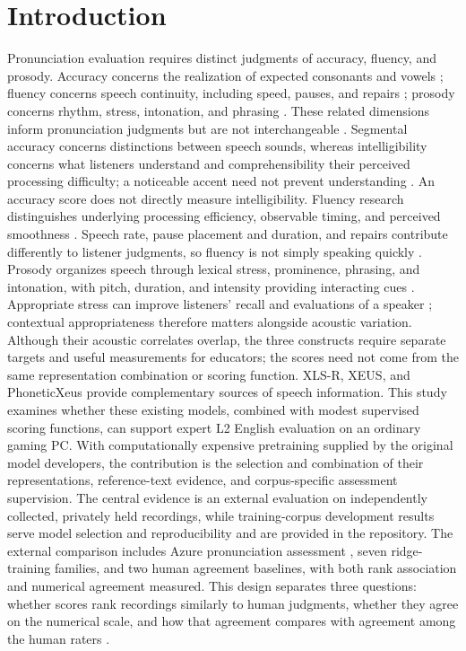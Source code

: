 \documentclass[cameraready]{Interspeech}
\begin{document}
\section{Introduction}
Pronunciation evaluation requires distinct judgments of accuracy, fluency, and prosody. Accuracy concerns the realization of expected consonants and vowels \cite{deterding,cai}; fluency concerns speech continuity, including speed, pauses, and repairs \cite{kormos,bosker}; prosody concerns rhythm, stress, intonation, and phrasing \cite{cole,cutler}. These related dimensions inform pronunciation judgments but are not interchangeable \cite{cai,isaacs}. Segmental accuracy concerns distinctions between speech sounds, whereas intelligibility concerns what listeners understand and comprehensibility their perceived processing difficulty; a noticeable accent need not prevent understanding \cite{munro}. An accuracy score does not directly measure intelligibility. Fluency research distinguishes underlying processing efficiency, observable timing, and perceived smoothness \cite{segalowitz}. Speech rate, pause placement and duration, and repairs contribute differently to listener judgments, so fluency is not simply speaking quickly \cite{kormos,bosker}. Prosody organizes speech through lexical stress, prominence, phrasing, and intonation, with pitch, duration, and intensity providing interacting cues \cite{cole,cutler}. Appropriate stress can improve listeners' recall and evaluations of a speaker \cite{hahn}; contextual appropriateness therefore matters alongside acoustic variation. Although their acoustic correlates overlap, the three constructs require separate targets and useful measurements for educators; the scores need not come from the same representation combination or scoring function. XLS-R, XEUS, and PhoneticXeus provide complementary sources of speech information. This study examines whether these existing models, combined with modest supervised scoring functions, can support expert L2 English evaluation on an ordinary gaming PC. With computationally expensive pretraining supplied by the original model developers, the contribution is the selection and combination of their representations, reference-text evidence, and corpus-specific assessment supervision. The central evidence is an external evaluation on independently collected, privately held recordings, while training-corpus development results serve model selection and reproducibility and are provided in the repository. The external comparison includes Azure pronunciation assessment \cite{azure}, seven ridge-training families, and two human agreement baselines, with both rank association and numerical agreement measured. This design separates three questions: whether scores rank recordings similarly to human judgments, whether they agree on the numerical scale, and how that agreement compares with agreement among the human raters \cite{williamson}.
\end{document}
